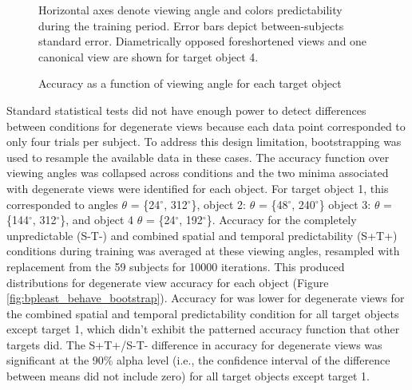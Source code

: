\documentclass[dwyatte_dissertation.tex]{subfiles}
\begin{document}
\begin{figure}[h!]
\begin{center}
\begin{tabular}{ll}
\end{tabular}
\end{center}
\caption{Accuracy as a function of viewing angle for each target object}{Horizontal axes denote viewing angle and colors predictability during the training period. Error bars depict between-subjects standard error. Diametrically opposed foreshortened views and one canonical view are shown for target object 4.}
\label{fig:bpleast_behave_rot}
\end{figure}

Standard statistical tests did not have enough power to detect differences between conditions for degenerate views because each data point corresponded to only four trials per subject. To address this design limitation, bootstrapping was used to resample the available data in these cases. The accuracy function over viewing angles was collapsed across conditions and the two minima associated with degenerate views were identified for each object. For target object 1, this corresponded to angles $\theta$ = \{24$^\circ$, 312$^\circ$\}, object 2: $\theta$ = \{48$^\circ$, 240$^\circ$\} object 3: $\theta$ = \{144$^\circ$, 312$^\circ$\}, and object 4 $\theta$ = \{24$^\circ$, 192$^\circ$\}. Accuracy for the completely unpredictable (S-T-) and combined spatial and temporal predictability (S+T+) conditions during training was averaged at these viewing angles, resampled with replacement from the 59 subjects for 10000 iterations. This produced distributions for degenerate view accuracy for each object (Figure \ref{fig:bpleast_behave_bootstrap}). Accuracy for was lower for degenerate views for the combined spatial and temporal predictability condition for all target objects except target 1, which didn't exhibit the patterned accuracy function that other targets did. The S+T+/S-T- difference in accuracy for degenerate views was significant at the 90\% alpha level (i.e., the confidence interval of the difference between means did not include zero) for all target objects except target 1.
\end{document}
